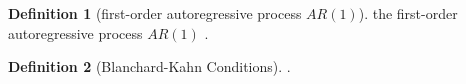 \documentclass[
	12pt,
	]{article}
\numberwithin{equation}{section}
\theoremstyle{definition}
\newtheorem{definition}{Definition}[section]
\theoremstyle{plain}
\theoremstyle{plain}
\theoremstyle{plain}
\begin{document}
\begin{definition}[first-order autoregressive process $AR(1)$]
	the first-order autoregressive process $AR(1)$ \cite[Lecture 5, p.4]{solis-garcia_ucb_2022}.
\end{definition}

\begin{definition}[Blanchard-Kahn Conditions]
	\cite[Hands on 5, p.14]{solis-garcia_ucb_2022}.
\end{definition}














\end{document}
